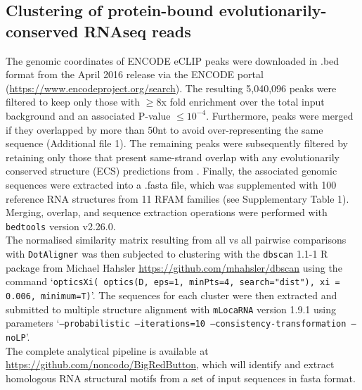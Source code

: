 \documentclass{bmcart}
\newcommand\dotaligner{\texttt{DotAligner}}
\begin{document}
\subsection*{Clustering of protein-bound evolutionarily-conserved RNAseq reads}

The genomic coordinates of ENCODE eCLIP peaks were downloaded in .bed format from the April 2016 release via the ENCODE portal (\url{https://www.encodeproject.org/search}). The resulting 5,040,096 peaks 
were filtered to keep only those with $\ge$8x fold enrichment over the total input background and an associated P-value  $\leq10^{-4}$. Furthermore, peaks were merged if they overlapped by more than 50nt to avoid over-representing the same sequence (Additional file 1). The remaining peaks were subsequently filtered by 
retaining only those that present same-strand overlap with any evolutionarily conserved structure (ECS) predictions from \cite{smith2013widespread}. Finally, the associated genomic sequences were extracted into a .fasta file, which was supplemented with 100 reference RNA structures from 11 RFAM families (see Supplementary Table 1). 
Merging, overlap, and sequence extraction operations were performed with \texttt{bedtools} version v2.26.0. \\

The normalised similarity matrix resulting from all vs all pairwise comparisons with \dotaligner{} was then 
subjected to clustering with the \texttt{dbscan} 1.1-1 R package from Michael Hahsler
 \url{https://github.com/mhahsler/dbscan} using the command `\texttt{opticsXi( optics(D, eps=1, minPts=4, search="dist"), xi = 0.006, minimum=T)}'. The sequences for each cluster were then extracted and submitted to multiple structure alignment with \texttt{mLocaRNA} version 1.9.1 using parameters  `\texttt{--probabilistic --iterations=10  --consistency-transformation --noLP}'.\\
 
The complete analytical pipeline is available at \url{https://github.com/noncodo/BigRedButton},
which will identify and extract homologous RNA structural motifs from a set of 
input sequences in fasta format. \\



\end{document}
